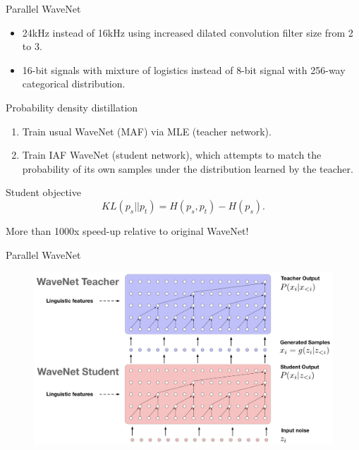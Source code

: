 \begin{frame}{Parallel WaveNet}
	\begin{itemize}
		\item 24kHz instead of 16kHz using increased dilated convolution filter size from 2 to 3.
		\item 16-bit signals with mixture of logistics instead of 8-bit signal with 256-way categorical distribution.
	\end{itemize}
	\begin{block}{Probability density distillation}
		\begin{enumerate}
			\item Train usual WaveNet (MAF) via MLE (teacher network).
			\item Train IAF WaveNet (student network), which attempts to match the probability of its own samples under the distribution learned by the teacher.
		\end{enumerate}
	\end{block}
	\vspace{-0.3cm}
	\begin{block}{Student objective}
		\vspace{-0.3cm}
		\[
			KL(p_s || p_t) = H(p_s, p_t) - H(p_s).
		\]
		\vspace{-0.3cm}
	\end{block}
	More than 1000x speed-up relative to original WaveNet!
\end{frame}
\begin{frame}{Parallel WaveNet}
	\begin{figure}
		\centering
		\includegraphics[width=\linewidth]{figs/parallel_wavenet.png}
	\end{figure}

\end{frame}
